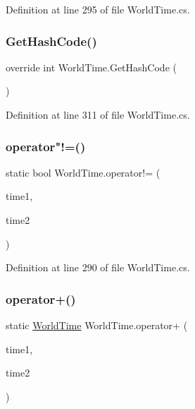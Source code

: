 Definition at line 295 of file World\+Time.\+cs.

\mbox{\label{struct_world_time_a50612e81737fa437c23138f70a7b0bc8}} 
\subsubsection{\texorpdfstring{Get\+Hash\+Code()}{GetHashCode()}}
{\footnotesize\ttfamily override int World\+Time.\+Get\+Hash\+Code (\begin{DoxyParamCaption}{ }\end{DoxyParamCaption})}



Definition at line 311 of file World\+Time.\+cs.

\mbox{\label{struct_world_time_a0d96fe442fb0d3b9907b8c552d416a2a}} 
\subsubsection{\texorpdfstring{operator"!=()}{operator!=()}}
{\footnotesize\ttfamily static bool World\+Time.\+operator!= (\begin{DoxyParamCaption}\item[{\hyperlink{struct_world_time}{World\+Time}}]{time1,  }\item[{\hyperlink{struct_world_time}{World\+Time}}]{time2 }\end{DoxyParamCaption})\hspace{0.3cm}{\ttfamily [static]}}



Definition at line 290 of file World\+Time.\+cs.

\mbox{\label{struct_world_time_ae54958426ca27a976a6a462fa5a7d3d2}} 
\subsubsection{\texorpdfstring{operator+()}{operator+()}}
{\footnotesize\ttfamily static \hyperlink{struct_world_time}{World\+Time} World\+Time.\+operator+ (\begin{DoxyParamCaption}\item[{\hyperlink{struct_world_time}{World\+Time}}]{time1,  }\item[{\hyperlink{struct_world_time}{World\+Time}}]{time2 }\end{DoxyParamCaption})\hspace{0.3cm}{\ttfamily [static]}}



